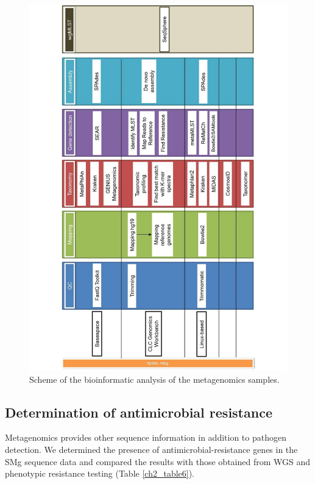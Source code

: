 \begin{figure}[h!]
\centering
\includegraphics[angle=-90,width=\textwidth]{figures/chapter 2/41598_2018_31873_Fig1_HTML.pdf}
\caption{Scheme of the bioinformatic analysis of the metagenomics samples.}
\label{fig:chap2_figure1}
\end{figure}

\subsection{Determination of antimicrobial resistance}

Metagenomics provides other sequence information in addition to pathogen detection. 
We determined the presence of antimicrobial-resistance genes in the SMg sequence data and compared the results with those obtained from WGS and phenotypic resistance testing (Table \ref{ch2_table6}).

